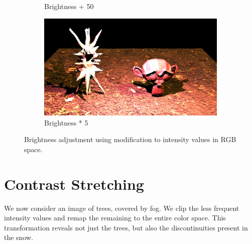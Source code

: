 \documentclass[a4paper]{article}
\begin{document}
\begin{figure}[H]
\begin{subfigure}[b]{.3\textwidth}
        \caption{Brightness + 50}
    \end{subfigure}
    \hfill
    \begin{subfigure}[b]{.3\textwidth}
        \centering
        \includegraphics[width=\textwidth]{output/monkey_multiplied_brightness.jpg}
        \caption{Brightness * 5}
    \end{subfigure}
    \hfill
    \caption{Brightness adjustment using modification to intensity values in RGB space.}
    \label{fig:brightness}
\end{figure}

\section{Contrast Stretching}

We now consider an image of trees, covered by fog. We clip the less frequent intensity values and remap the remaining to the entire color space. This transformation reveals not just the trees, but also the discontinuities present in the snow.
\end{document}
